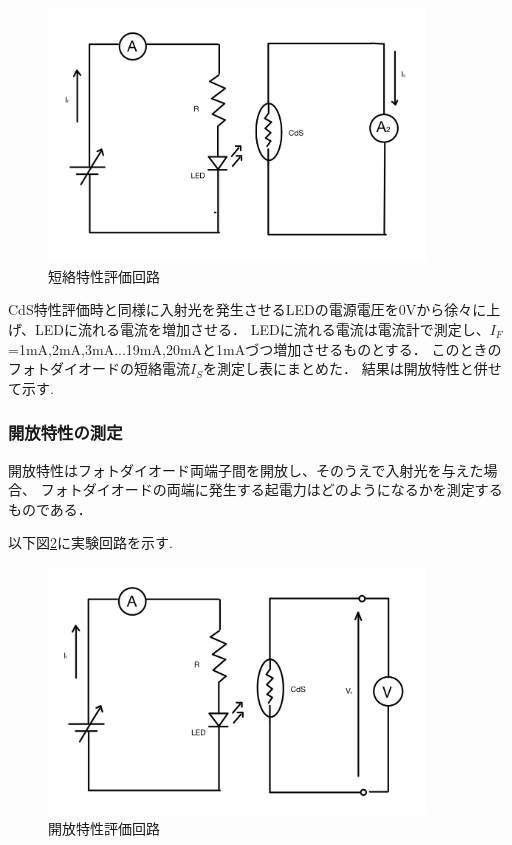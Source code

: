 \documentclass[titlepage]{jarticle}
\begin{document}
\begin{figure}[H]
    \begin{center}
        \includegraphics[width=10cm]{image/4.jpg}
        \caption{短絡特性評価回路}
        \label{fig:短絡特性評価回路}
    \end{center}
\end{figure}

CdS特性評価時と同様に入射光を発生させるLEDの電源電圧を0Vから徐々に上げ、LEDに流れる電流を増加させる．
LEDに流れる電流は電流計で測定し、$I_F$=1mA,2mA,3mA...19mA,20mAと1mAづつ増加させるものとする．
このときのフォトダイオードの短絡電流$I_S$を測定し表にまとめた．
結果は開放特性と併せて示す.

\subsubsection{開放特性の測定}
開放特性はフォトダイオード両端子間を開放し、そのうえで入射光を与えた場合、
フォトダイオードの両端に発生する起電力はどのようになるかを測定するものである．

以下図\ref{fig:開放特性評価回路}に実験回路を示す.

\begin{figure}[H]
    \begin{center}
        \includegraphics[width=10cm]{image/5.jpg}
        \caption{開放特性評価回路}
        \label{fig:開放特性評価回路}
    \end{center}
\end{figure}
\end{document}
